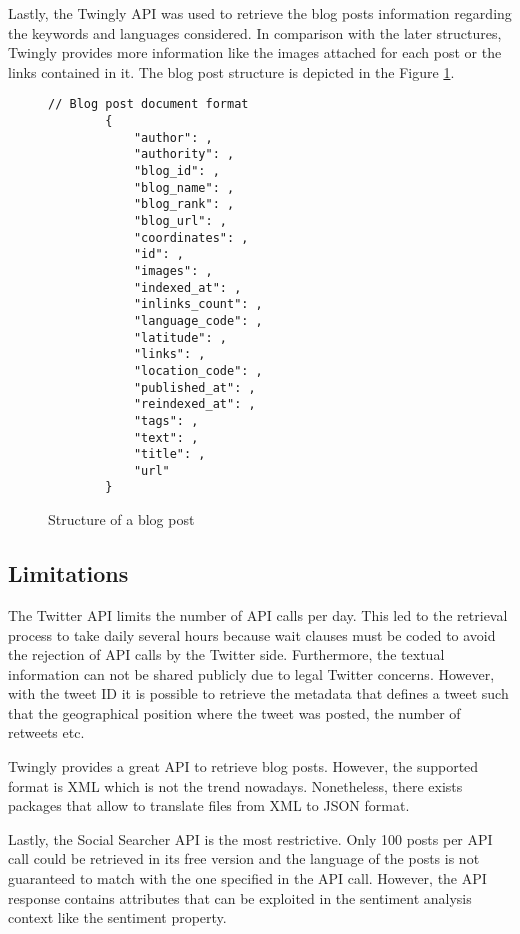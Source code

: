 \par

Lastly, the Twingly API was used to retrieve the blog posts information regarding the keywords and languages considered. In comparison with the later structures, Twingly provides more information like the images attached for each post or the links contained in it. The blog post structure is depicted in the Figure \ref{fig:twinglyStructure}.
\begin{figure}[H]
	\begin{Verbatim}[xleftmargin=.5in]
		// Blog post document format
		{
			"author": ,
			"authority": ,
			"blog_id": ,
			"blog_name": ,
			"blog_rank": ,
			"blog_url": ,
			"coordinates": ,
			"id": ,
			"images": ,
			"indexed_at": ,
			"inlinks_count": ,
			"language_code": ,
			"latitude": ,
			"links": ,
			"location_code": ,
			"published_at": ,
			"reindexed_at": ,
			"tags": ,
			"text": ,
			"title": ,
			"url"
		}
	\end{Verbatim}
	\caption{Structure of a blog post}
	\label{fig:twinglyStructure}
\end{figure}
\subsection{Limitations}

The Twitter API limits the number of API calls per day. This led to the retrieval process to take daily several hours because wait clauses must be coded to avoid the rejection of API calls by the Twitter side. Furthermore, the textual information can not be shared publicly due to legal Twitter concerns. However, with the tweet ID it is possible to retrieve the metadata that defines a tweet such that the geographical position where the tweet was posted, the number of retweets etc. \\

\par Twingly provides a great API to retrieve blog posts. However, the supported format is XML which is not the trend nowadays. Nonetheless, there exists packages that allow to translate files from XML to JSON format.
\par Lastly, the Social Searcher API is the most restrictive. Only 100 posts per API call could be retrieved in its free version and the language of the posts is not guaranteed to match with the one specified in the API call. However, the API response contains attributes that can be exploited in the sentiment analysis context like the sentiment property.


